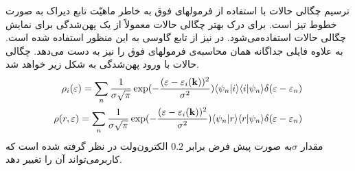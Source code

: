 ترسیم چگالی حالات با استفاده از فرمولهای فوق به خاطر ماهیّت تابع دیراک به صورت خطوط تیز است. برای درک بهتر 
چگالی حالات معمولاً از یک پهن‌شدگی برای نمایش چگالی حالات استفاده‌می‌شود. در 
نیز از تابع گاوسی به این منظور استفاده شده است. به علاوه فایلی جداگانه همان محاسبه‌ی فرمولهای فوق 
را نیز به دست‌ می‌دهد. چگالی حالات با ورود پهن‌شدگی به شکل زیر خواهد شد.
\begin{align}
\rho_{i}(\varepsilon)=\sum_n\frac{1}{\sigma\sqrt{\pi}}\exp(-\frac{(\varepsilon-\varepsilon_i({\bf k}))^2}{\sigma^2})\langle\psi_n|i\rangle\langle i|\psi_n\rangle\delta(\varepsilon-\varepsilon_n)\label{eq:4.2.5}\\
\rho(r,\varepsilon)=\sum_n\frac{1}{\sigma\sqrt{\pi}}\exp(-\frac{(\varepsilon-\varepsilon_i({\bf k}))^2}{\sigma^2})\langle\psi_n|r\rangle\langle r|\psi_n\rangle\delta(\varepsilon-\varepsilon_n)\label{eq:4.2.6}
\end{align}
مقدار $\sigma$به صورت پیش فرض برابر $0.2$ الکترون‌ولت در نظر گرفته شده است که کاربر‌می‌تواند آن را تغییر 
دهد.
